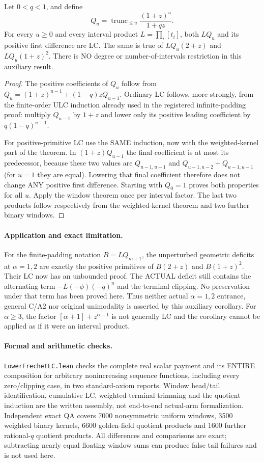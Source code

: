 \begin{corollary}
Let $0<q<1$, and define
\[
 Q_u=\operatorname{trunc}_{\le u}\frac{(1+z)^u}{1+qz}.
\]
For every $u\ge0$ and every interval product $L=\prod_i[t_i]$,
both $LQ_u$ and its positive first difference are LC. The same
is true of $LQ_u(2+z)$ and $LQ_u(1+z)^2$.
There is NO degree or number-of-intervals restriction in this
auxiliary result.
\end{corollary}
\begin{proof}
The positive coefficients of $Q_u$ follow from
$Q_u=(1+z)^{u-1}+(1-q)zQ_{u-1}$. Ordinary LC follows, more
strongly, from the finite-order ULC induction already used in the
registered infinite-padding proof: multiply $Q_{u-1}$ by $1+z$
and lower only its positive leading coefficient by
$q(1-q)^{u-1}$.

For positive-primitive LC use the SAME induction, now with the
weighted-kernel part of the theorem. In $(1+z)Q_{u-1}$ the final
coefficient is at most its predecessor, because these two values
are $Q_{u-1,u-1}$ and $Q_{u-1,u-2}+Q_{u-1,u-1}$
(for $u=1$ they are equal). Lowering that final coefficient therefore
does not change ANY positive first difference. Starting with $Q_0=1$
proves both properties for all $u$. Apply the window theorem once
per interval factor. The last two products follow respectively
from the weighted-kernel theorem and two further binary windows.
\end{proof}

\paragraph{Application and exact limitation.}
For the finite-padding notation $B=LQ_{m+1}$, the unperturbed
geometric deficits at $\alpha=1,2$ are exactly the positive
primitives of $B(2+z)$ and $B(1+z)^2$. Their LC now has an
unbounded proof. The ACTUAL deficit still contains the alternating
term $-L(-\phi)(-q)^n$ and the terminal clipping. No preservation
under that term has been proved here. Thus neither actual
$\alpha=1,2$ entrance, general C/A2 nor original unimodality is
asserted by this auxiliary corollary. For $\alpha\ge3$, the factor
$[\alpha+1]+z^{\alpha-1}$ is not generally LC and the corollary
cannot be applied as if it were an interval product.

\paragraph{Formal and arithmetic checks.}
\texttt{LowerFrechetLC.lean} checks the complete real scalar
payment and its ENTIRE composition for arbitrary nonincreasing
sequence functions, including every zero/clipping case, in two
standard-axiom reports. Window head/tail identification, cumulative
LC, weighted-terminal trimming and the quotient induction are the
written assembly, not end-to-end actual-arm formalization.
Independent exact QA covers 7000 nonsymmetric uniform windows,
3500 weighted binary kernels, 6600 golden-field quotient products
and 1600 further rational-$q$ quotient products. All differences
and comparisons are exact; subtracting nearly equal floating window
sums can produce false tail failures and is not used here.
